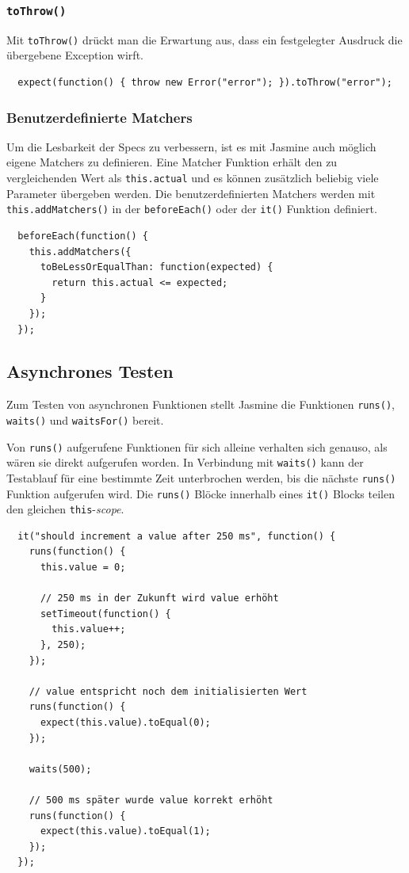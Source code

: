 \documentclass[11pt, a4paper]{article}
\begin{document}
\subsubsection*{\texttt{toThrow()}}

Mit \texttt{toThrow()} drückt man die Erwartung aus, dass ein festgelegter
Ausdruck die übergebene Exception wirft.

\begin{verbatim}
  expect(function() { throw new Error("error"); }).toThrow("error");
\end{verbatim}

\subsubsection*{Benutzerdefinierte Matchers}

Um die Lesbarkeit der Specs zu verbessern, ist es mit Jasmine auch möglich eigene
Matchers zu definieren. Eine Matcher Funktion erhält den zu vergleichenden Wert
als \texttt{this.actual} und es können zusätzlich beliebig viele Parameter
übergeben werden. Die benutzerdefinierten Matchers werden mit
\texttt{this.addMatchers()} in der \texttt{beforeEach()} oder der \texttt{it()}
Funktion definiert.

\begin{verbatim}
  beforeEach(function() {
    this.addMatchers({
      toBeLessOrEqualThan: function(expected) {
        return this.actual <= expected;
      }
    });
  });
\end{verbatim}

\subsection{Asynchrones Testen}

Zum Testen von asynchronen Funktionen stellt Jasmine die Funktionen
\texttt{runs()}, \texttt{waits()} und \texttt{waitsFor()} bereit.

Von \texttt{runs()} aufgerufene Funktionen für sich alleine verhalten sich
genauso, als wären sie direkt aufgerufen worden. In Verbindung mit
\texttt{waits()} kann der Testablauf für eine bestimmte Zeit unterbrochen
werden, bis die nächste \texttt{runs()} Funktion aufgerufen wird. Die
\texttt{runs()} Blöcke innerhalb eines \texttt{it()} Blocks teilen den gleichen
\texttt{this}-\emph{scope}.

\begin{verbatim}
  it("should increment a value after 250 ms", function() {
    runs(function() {
      this.value = 0;

      // 250 ms in der Zukunft wird value erhöht
      setTimeout(function() {
        this.value++;
      }, 250);
    });

    // value entspricht noch dem initialisierten Wert
    runs(function() {
      expect(this.value).toEqual(0);
    });

    waits(500);

    // 500 ms später wurde value korrekt erhöht
    runs(function() {
      expect(this.value).toEqual(1);
    });
  });
\end{verbatim}
\end{document}
